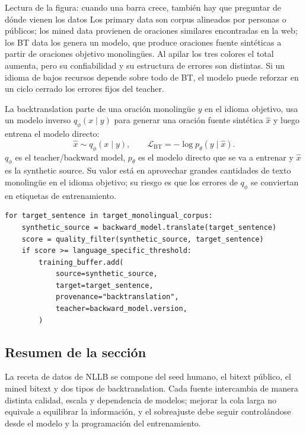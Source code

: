 
\begin{knowledgebox}{Lectura de la figura: cuando una barra crece, también hay que preguntar de dónde vienen los datos}
Los primary data son corpus alineados por personas o públicos; los mined data provienen de oraciones similares encontradas en la web; los BT data los genera un modelo, que produce oraciones fuente sintéticas a partir de oraciones objetivo monolingües. Al apilar los tres colores el total aumenta, pero su confiabilidad y su estructura de errores son distintas. Si un idioma de bajos recursos depende sobre todo de BT, el modelo puede reforzar en un ciclo cerrado los errores fijos del teacher.
\end{knowledgebox}

La backtranslation parte de una oración monolingüe $y$ en el idioma objetivo, usa un modelo inverso $q_\phi(x\mid y)$ para generar una oración fuente sintética $\hat{x}$ y luego entrena el modelo directo:
\[
\hat{x}\sim q_\phi(x\mid y),\qquad
\mathcal{L}_{\text{BT}}=-\log p_\theta(y\mid\hat{x}).
\]
$q_\phi$ es el teacher/backward model, $p_\theta$ es el modelo directo que se va a entrenar y $\hat{x}$ es la synthetic source. Su valor está en aprovechar grandes cantidades de texto monolingüe en el idioma objetivo; su riesgo es que los errores de $q_\phi$ se conviertan en etiquetas de entrenamiento.

\begin{lstlisting}[caption={Flujo conceptual de backtranslation con provenance y control de calidad}]
for target_sentence in target_monolingual_corpus:
    synthetic_source = backward_model.translate(target_sentence)
    score = quality_filter(synthetic_source, target_sentence)
    if score >= language_specific_threshold:
        training_buffer.add(
            source=synthetic_source,
            target=target_sentence,
            provenance="backtranslation",
            teacher=backward_model.version,
        )
\end{lstlisting}


\subsection{Resumen de la sección}

La receta de datos de NLLB se compone del seed humano, el bitext público, el mined bitext y dos tipos de backtranslation. Cada fuente intercambia de manera distinta calidad, escala y dependencia de modelos; mejorar la cola larga no equivale a equilibrar la información, y el sobreajuste debe seguir controlándose desde el modelo y la programación del entrenamiento.
